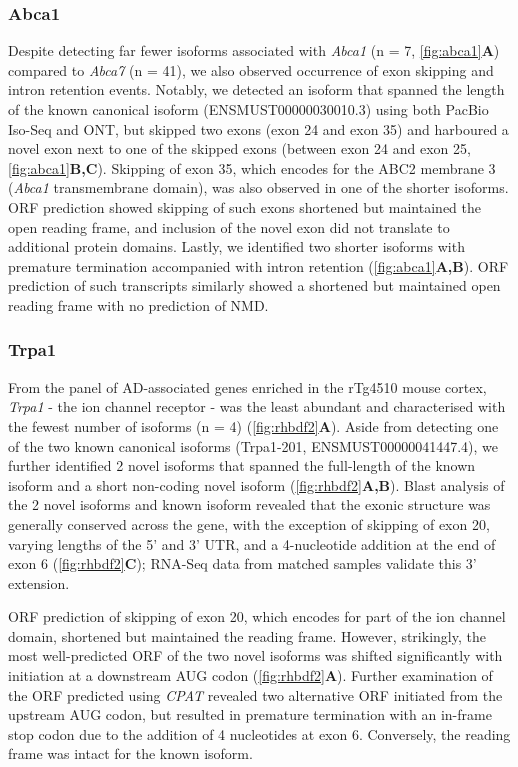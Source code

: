 \subsubsection{Abca1}
Despite detecting far fewer isoforms associated with \textit{Abca1} (n = 7, \cref{fig:abca1}\textbf{A}) compared to \textit{Abca7} (n = 41), we also observed occurrence of exon skipping and intron retention events. Notably, we detected an isoform that spanned the length of the known canonical isoform (ENSMUST00000030010.3) using both PacBio Iso-Seq and ONT, but skipped two exons (exon 24 and exon 35) and harboured a novel exon next to one of the skipped exons (between exon 24 and exon 25, \cref{fig:abca1}\textbf{B,C}). Skipping of exon 35, which encodes for the ABC2 membrane 3 (\textit{Abca1} transmembrane domain), was also observed in one of the shorter isoforms. ORF prediction showed skipping of such exons shortened but maintained the open reading frame, and inclusion of the novel exon did not translate to additional protein domains. Lastly, we identified two shorter isoforms with premature termination accompanied with intron retention (\cref{fig:abca1}\textbf{A,B}). ORF prediction of such transcripts similarly showed a shortened but maintained open reading frame with no prediction of NMD. 

\subsubsection{Trpa1}
From the panel of AD-associated genes enriched in the rTg4510 mouse cortex, \textit{Trpa1} - the ion channel receptor - was the least abundant and characterised with the fewest number of isoforms (n = 4) (\cref{fig:rhbdf2}\textbf{A}). Aside from detecting one of the two known canonical isoforms (Trpa1-201, ENSMUST00000041447.4), we further identified 2 novel isoforms that spanned the full-length of the known isoform and a short non-coding novel isoform (\cref{fig:rhbdf2}\textbf{A,B}). Blast analysis of the 2 novel isoforms and known isoform revealed that the exonic structure was generally conserved across the gene, with the exception of skipping of exon 20, varying lengths of the 5' and 3' UTR, and a 4-nucleotide addition at the end of exon 6 (\cref{fig:rhbdf2}\textbf{C}); RNA-Seq data from matched samples validate this 3' extension. 

ORF prediction of skipping of exon 20, which encodes for part of the ion channel domain, shortened but maintained the reading frame. However, strikingly, the most well-predicted ORF of the two novel isoforms was shifted significantly with initiation at a downstream AUG codon (\cref{fig:rhbdf2}\textbf{A}). Further examination of the ORF predicted using \textit{CPAT} revealed two alternative ORF initiated from the upstream AUG codon, but resulted in premature termination with an in-frame stop codon due to the addition of 4 nucleotides at exon 6. Conversely, the reading frame was intact for the known isoform.             

